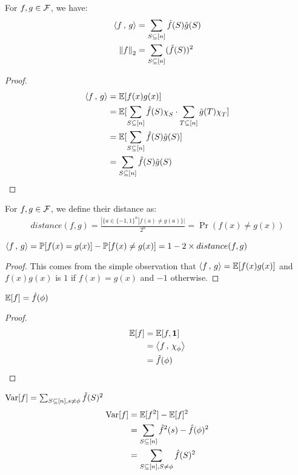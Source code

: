 \begin{lemma}
    For $f,g \in \mathcal{F}$, we have:
    \begin{align*}
        \left\langle {f} \,,\, {g} \right\rangle &= \sum_{S \subseteq [n]} \hat{f}(S)\hat{g}(S)\\
        \left\|{f}\right\|_2 &= \sum_{S \subseteq [n]} (\hat{f}(S))^2\\
    \end{align*}
    \begin{proof}
        \begin{align*}
            \inn{f}{g}  &= \E[f(x)g(x)]\\
                        &= \E[\sum_{S \subseteq [n]} \fhat(S)\chi_S \cdot \sum_{T \subseteq [n]} \ghat(T)\chi_T ]\\
                        &= \E[\sum_{S \subseteq [n]} \fhat(S)\ghat(S)]\\
                        &= \sum_{S \subseteq [n]} \fhat(S)\ghat(S)
        \end{align*}
    \end{proof}
\end{lemma}

\begin{definition}[distance(f,g)]
    For $f,g \in \mathcal{F}$, we define their distance as:
    \begin{align*}
        distance(f,g) = \frac{|\{a \in \{-1,1\}^n|f(a) \neq g(a)\}|}{2^n} = \Pr(f(x)\neq g(x))
    \end{align*}
\end{definition}

\begin{lemma}$\left\langle {f} \,,\, {g} \right\rangle = \mathbb{P}[f(x)=g(x)] - \mathbb{P}[f(x)\neq g(x)] = 1 - 2\times distance(f,g)$
\begin{proof}
    This comes from the simple observation that $\left\langle {f} \,,\, {g} \right\rangle = \mathbb{E}[f(x)g(x)]$ and $f(x)g(x)$ is $1$ if $f(x) = g(x)$ and $-1$ otherwise.
\end{proof}
\end{lemma}

\begin{lemma}
    $\mathbb{E}[f] = \hat{f}(\phi)$
    \begin{proof}
        \begin{align*}
            \E[f]   &= \E[f,\mathbf{1}]\\
                    &= \inn{f}{\chi_\phi}\\
                    &= \fhat(\phi)
        \end{align*}
    \end{proof}
\end{lemma}

\begin{lemma}
    $\mathrm{Var}[f] = \sum_{S\subseteq [n],s \neq \phi} \hat{f}(S)^2$
    \begin{align*}
    \mathrm{Var}[f]     &= \mathbb{E}[f^2] -\mathbb{E}[f]^2\\
                &= \sum_{S \subseteq [n]} \hat{f}^2(s) - \hat{f}(\phi)^2 \\
                &= \sum_{S\subseteq [n],S \neq \phi} \hat{f}(S)^2
    \end{align*}
\end{lemma}

